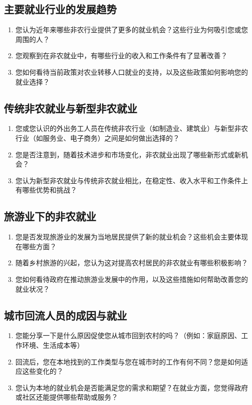 \documentclass[12pt]{article}
\begin{document}
\subsection*{主要就业行业的发展趋势}
\begin{enumerate}
    \item 您认为近年来哪些非农行业提供了更多的就业机会？这些行业为何吸引您或您周围的人？
    \item 您观察到在非农就业中，有哪些行业的收入和工作条件有了显著改善？
    \item 您如何看待当前政策对农业转移人口就业的支持，以及这些政策如何影响您的就业选择？
\end{enumerate}

\subsection*{传统非农就业与新型非农就业}
\begin{enumerate}
    \item 您或您认识的外出务工人员在传统非农行业（如制造业、建筑业）与新型非农行业（如服务业、电子商务）之间是如何做出选择的？
    \item 您是否注意到，随着技术进步和市场变化，非农就业出现了哪些新形式或新机会？
    \item 您认为新型非农就业与传统非农就业相比，在稳定性、收入水平和工作条件上有哪些优势和挑战？
\end{enumerate}

\subsection*{旅游业下的非农就业}
\begin{enumerate}
    \item 您是否发现旅游业的发展为当地居民提供了新的就业机会？这些机会主要体现在哪些方面？
    \item 随着乡村旅游的兴起，您认为这对提高农村居民的非农就业有哪些积极影响？
    \item 您如何看待政府在推动旅游业发展中的作用，以及这些措施如何帮助改善您的就业状况？
\end{enumerate}

\subsection*{城市回流人员的成因与就业}
\begin{enumerate}
    \item 您能分享一下是什么原因促使您从城市回到农村的吗？（例如：家庭原因、工作环境、生活成本等）
    \item 回流后，您在本地找到的工作类型与您在城市时的工作有何不同？您是如何适应这些变化的？
    \item 您认为本地的就业机会是否能满足您的需求和期望？在就业方面，您觉得政府或社区还能提供哪些帮助或服务？
\end{enumerate}

\printbibliography
\end{document}
